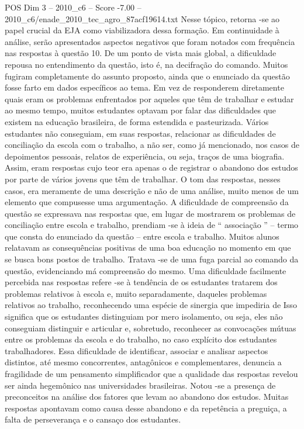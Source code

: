 \begin{textsample}{POS Dim 3 – 2010\_c6 – Score -7.00 – 2010\_c6/enade\_2010\_tec\_agro\_87acf19614.txt}
Nesse tópico, retorna -se ao papel crucial da EJA como viabilizadora dessa formação.
Em continuidade à análise, serão apresentados aspectos negativos que foram notados com frequência nas respostas à questão 10.
De um ponto de vista mais global, a dificuldade repousa no entendimento da questão, isto é, na decifração do comando.
Muitos fugiram completamente do assunto proposto, ainda que o enunciado da questão fosse farto em dados específicos ao tema.
Em vez de responderem diretamente quais eram os problemas enfrentados por aqueles que têm de trabalhar e estudar ao mesmo tempo, muitos estudantes optavam por falar das dificuldades que existem na educação brasileira, de forma estendida e pasteurizada.
Vários estudantes não conseguiam, em suas respostas, relacionar as dificuldades de conciliação da escola com o trabalho, a não ser, como já mencionado, nos casos de depoimentos pessoais, relatos de experiência, ou seja, traços de uma biografia.
Assim, eram respostas cujo teor era apenas o de registrar o abandono dos estudos por parte de vários jovens que têm de trabalhar.
O tom das respostas, nesses casos, era meramente de uma descrição e não de uma análise, muito menos de um elemento que compusesse uma argumentação.
A dificuldade de compreensão da questão se expressava nas respostas que, em lugar de mostrarem os problemas de conciliação entre escola e trabalho, prendiam -se à ideia de “ associação ” – termo que consta do enunciado da questão – entre escola e trabalho.
Muitos alunos relatavam as consequências positivas de uma boa educação no momento em que se busca bons postos de trabalho.
Tratava -se de uma fuga parcial ao comando da questão, evidenciando má compreensão do mesmo.
Uma dificuldade facilmente percebida nas respostas refere -se à tendência de os estudantes tratarem dos problemas relativos à escola e, muito separadamente, daqueles problemas relativos ao trabalho, reconhecendo uma espécie de sinergia que impediria de Isso significa que os estudantes distinguiam por mero isolamento, ou seja, eles não conseguiam distinguir e articular e, sobretudo, reconhecer as convocações mútuas entre os problemas da escola e do trabalho, no caso explícito dos estudantes trabalhadores.
Essa dificuldade de identificar, associar e analisar aspectos distintos, até mesmo concorrentes, antagônicos e complementares, denuncia a fragilidade de um pensamento simplificador que a qualidade das respostas revelou ser ainda hegemônico nas universidades brasileiras.
Notou -se a presença de preconceitos na análise dos fatores que levam ao abandono dos estudos.
Muitas respostas apontavam como causa desse abandono e da repetência a preguiça, a falta de perseverança e o cansaço dos estudantes.

\end{textsample}
